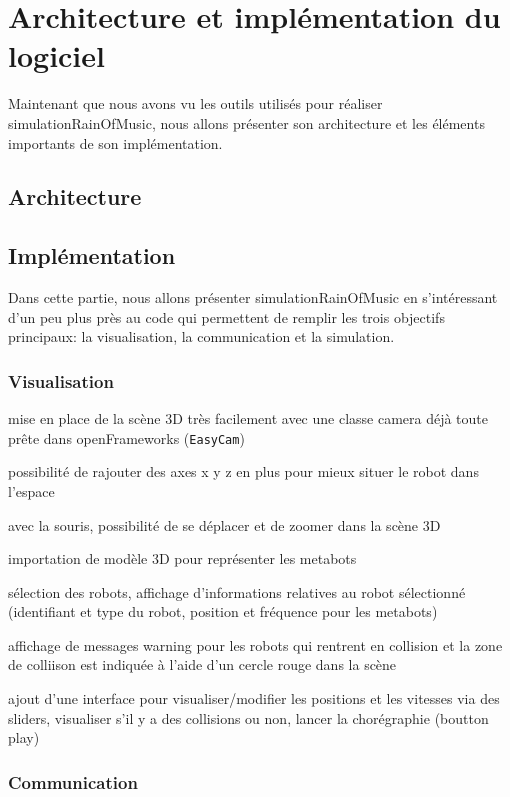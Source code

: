 \section{Architecture et implémentation du logiciel}

Maintenant que nous avons vu les outils utilisés pour réaliser simulationRainOfMusic, nous allons présenter son architecture et les éléments importants de son implémentation.

\subsection{Architecture}



\subsection{Implémentation}

Dans cette partie, nous allons présenter simulationRainOfMusic en s'intéressant d'un peu plus près au code qui permettent de remplir les trois objectifs principaux: la visualisation, la communication et la simulation.

\subsubsection{Visualisation}

mise en place de la scène 3D très facilement avec une classe camera déjà toute prête dans openFrameworks (\verb|EasyCam|)

possibilité de rajouter des axes x y z en plus pour mieux situer le robot dans l'espace

avec la souris, possibilité de se déplacer et de zoomer dans la scène 3D 

importation de modèle 3D pour représenter les metabots

sélection des robots, affichage d'informations relatives au robot sélectionné (identifiant et type du robot, position et fréquence pour les metabots)

affichage de messages warning pour les robots qui rentrent en collision et la zone de colliison est indiquée à l'aide d'un cercle rouge dans la scène

ajout d'une interface pour visualiser/modifier les positions et les vitesses via des sliders, visualiser s'il y a des collisions ou non, lancer la chorégraphie (boutton play)

\subsubsection{Communication}

